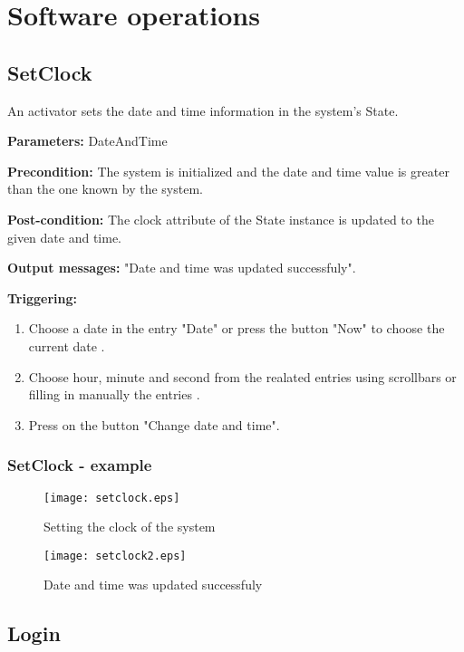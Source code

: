 \chapter{Software operations}
\label{chap:soptware_operations}
\section{SetClock}
\label{operation:CloseCrisis}
An activator sets the date and time information in the system's State.
\begin{description}
	\item \textbf{Parameters:} DateAndTime
	\item \textbf{Precondition:} The system is initialized and the date and time
	value is greater than the one known by the system.
	\item \textbf{Post-condition:} The clock attribute of the State instance is
	updated to the given date and time.
	\item \textbf{Output messages:} "Date and time was updated
	successfuly".
	
	\item \textbf{Triggering:}
	
	\begin{enumerate}
		\item Choose a date in the entry "Date" or press the button "Now" to choose
		the current date .
		\item Choose hour, minute and second from the realated entries using
		scrollbars or filling in manually the entries .
		\item Press on the button "Change date and time".
	\end{enumerate}
\end{description}

\subsection{SetClock - example}

\begin{figure}[h]
    \texttt{[image: setclock.eps]}
	\caption{Setting the clock of the system}
\end{figure}

\begin{figure}[h]
    \texttt{[image: setclock2.eps]}
	\caption{Date and time was updated successfuly}
\end{figure}

\section{Login}
\label{operation:Login}

